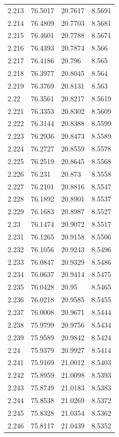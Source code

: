 \begin{tabular}{llll}
2.213 & 76.5017 & 20.7617 & 8.5691 \\
2.214 & 76.4809 & 20.7703 & 8.5681 \\
2.215 & 76.4601 & 20.7788 & 8.5671 \\
2.216 & 76.4393 & 20.7874 & 8.566 \\
2.217 & 76.4186 & 20.796 & 8.565 \\
2.218 & 76.3977 & 20.8045 & 8.564 \\
2.219 & 76.3769 & 20.8131 & 8.563 \\
2.22 & 76.3561 & 20.8217 & 8.5619 \\
2.221 & 76.3353 & 20.8302 & 8.5609 \\
2.222 & 76.3144 & 20.8388 & 8.5599 \\
2.223 & 76.2936 & 20.8473 & 8.5589 \\
2.224 & 76.2727 & 20.8559 & 8.5578 \\
2.225 & 76.2519 & 20.8645 & 8.5568 \\
2.226 & 76.231 & 20.873 & 8.5558 \\
2.227 & 76.2101 & 20.8816 & 8.5547 \\
2.228 & 76.1892 & 20.8901 & 8.5537 \\
2.229 & 76.1683 & 20.8987 & 8.5527 \\
2.23 & 76.1474 & 20.9072 & 8.5517 \\
2.231 & 76.1265 & 20.9158 & 8.5506 \\
2.232 & 76.1056 & 20.9243 & 8.5496 \\
2.233 & 76.0847 & 20.9329 & 8.5486 \\
2.234 & 76.0637 & 20.9414 & 8.5475 \\
2.235 & 76.0428 & 20.95 & 8.5465 \\
2.236 & 76.0218 & 20.9585 & 8.5455 \\
2.237 & 76.0008 & 20.9671 & 8.5444 \\
2.238 & 75.9799 & 20.9756 & 8.5434 \\
2.239 & 75.9589 & 20.9842 & 8.5424 \\
2.24 & 75.9379 & 20.9927 & 8.5414 \\
2.241 & 75.9169 & 21.0012 & 8.5403 \\
2.242 & 75.8959 & 21.0098 & 8.5393 \\
2.243 & 75.8749 & 21.0183 & 8.5383 \\
2.244 & 75.8538 & 21.0269 & 8.5372 \\
2.245 & 75.8328 & 21.0354 & 8.5362 \\
2.246 & 75.8117 & 21.0439 & 8.5352 \\

\end{tabular}
